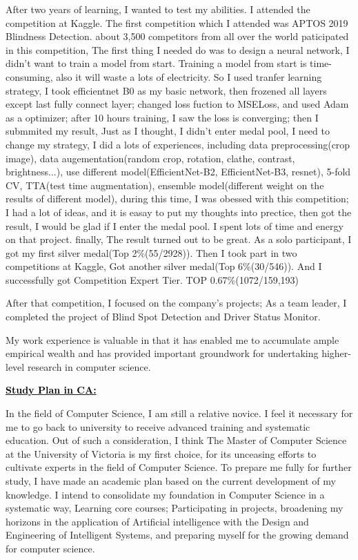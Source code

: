 \documentclass[12pt]{article}
\newcommand{\statement}[1]{\par\medskip
  \underline{\textcolor{black}{\textbf{#1:}}}\space
}
\begin{document}
\bigskip

After two years of learning, I wanted to test my abilities. I attended the competition at Kaggle. The first competition which I attended was APTOS 2019 Blindness Detection. about 3,500 competitors from all over the world paticipated in this competition, The first thing I needed do was to design a neural network, I didn't want to train a model from start. Training a model from start is time-consuming, also it will waste a lots of electricity. So I used tranfer learning strategy, I took efficientnet B0 as my basic network, then frozened all layers except last fully connect layer; changed loss fuction to MSELoss, and used Adam as a optimizer; after 10 hours training, I saw the loss is converging; then I submmited my result, Just as I thought, I didn't enter medal pool, I need to change my strategy, I did a lots of experiences, including data preprocessing(crop image), data augementation(random crop, rotation, clathe, contrast, brightness...), use different model(EfficientNet-B2, EfficientNet-B3, resnet),  5-fold CV, TTA(test time augmentation), ensemble model(different weight on the results of different model), during this time, I was obessed with this competition; I had a lot of ideas, and it is easay to put my thoughts into prectice, then got the result, I would be glad if I enter the medal pool. I spent lots of time and energy on that project. finally, The result turned out to be great. As a solo participant, I got my first silver medal(Top 2\%(55/2928)). Then I took part in two competitions at Kaggle, Got another silver medal(Top 6\%(30/546)). And I successfully got Competition Expert Tier. TOP 0.67\%(1072/159,193)

\bigskip

After that competition, I focused on the company's projects; As a team leader, I completed the project of Blind Spot Detection and Driver Status Monitor.

\bigskip

My work experience is valuable in that it has enabled me to accumulate ample empirical wealth and has provided important groundwork for undertaking higher-level research in computer science.

\bigskip

\statement{Study Plan in CA}
In the field of Computer Science, I am still a relative novice. I feel it necessary for me to go back to university to receive advanced training and systematic education. Out of such a consideration, I think The Master of Computer Science at the University of Victoria is my first choice, for its unceasing efforts to cultivate experts in the field of Computer Science. To prepare me fully for further study, I have made an academic plan based on the current development of my knowledge. I intend to consolidate my foundation in Computer Science in a systematic way, Learning core courses; Participating in projects, broadening my horizons in the application of Artificial intelligence with the Design and Engineering of Intelligent Systems, and preparing myself for the growing demand for computer science. 
\end{document}

